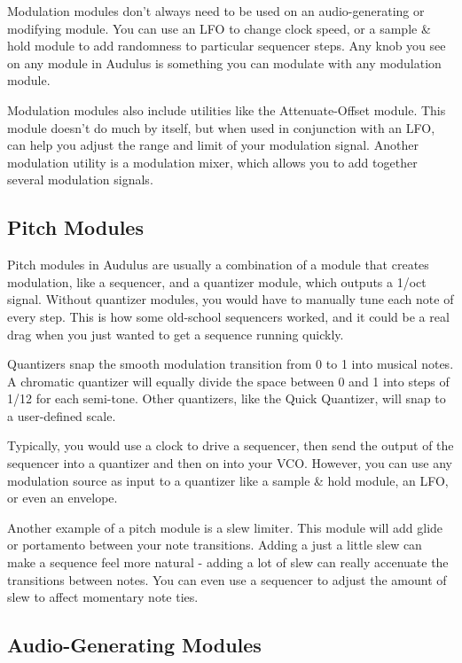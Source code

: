\documentclass[11pt]{book}
\begin{document}
\begin{multicols*}{2}
Modulation modules don't always need to be used on an audio-generating or modifying module. You can use an LFO to change clock speed, or a sample \& hold module to add randomness to particular sequencer steps. Any knob you see on any module in Audulus is something you can modulate with any modulation module. 

Modulation modules also include utilities like the Attenuate-Offset module. This module doesn't do much by itself, but when used in conjunction with an LFO, can help you adjust the range and limit of your modulation signal. Another modulation utility is a modulation mixer, which allows you to add together several modulation signals.

\subsection{Pitch Modules}

Pitch modules in Audulus are usually a combination of a module that creates modulation, like a sequencer, and a quantizer module, which outputs a 1/oct signal. Without quantizer modules, you would have to manually tune each note of every step. This is how some old-school sequencers worked, and it could be a real drag when you just wanted to get a sequence running quickly.

Quantizers snap the smooth modulation transition from 0 to 1 into musical notes. A chromatic quantizer will equally divide the space between 0 and 1 into steps of 1/12 for each semi-tone. Other quantizers, like the Quick Quantizer, will snap to a user-defined scale.

Typically, you would use a clock to drive a sequencer, then send the output of the sequencer into a quantizer and then on into your VCO. However, you can use any modulation source as input to a quantizer like a sample \& hold module, an LFO, or even an envelope.

Another example of a pitch module is a slew limiter. This module will add glide or portamento between your note transitions. Adding a just a little slew can make a sequence feel more natural - adding a lot of slew can really accenuate the transitions between notes. You can even use a sequencer to adjust the amount of slew to affect momentary note ties.

\subsection{Audio-Generating Modules}


\end{multicols*}
\end{document}
